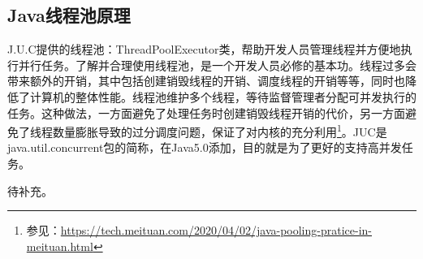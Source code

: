 \documentclass[../../../interview-questions.tex]{subfiles}
\begin{document}
\subsection{Java线程池原理}

J.U.C提供的线程池：ThreadPoolExecutor类，帮助开发人员管理线程并方便地执行并行任务。了解并合理使用线程池，是一个开发人员必修的基本功。线程过多会带来额外的开销，其中包括创建销毁线程的开销、调度线程的开销等等，同时也降低了计算机的整体性能。线程池维护多个线程，等待监督管理者分配可并发执行的任务。这种做法，一方面避免了处理任务时创建销毁线程开销的代价，另一方面避免了线程数量膨胀导致的过分调度问题，保证了对内核的充分利用\footnote{参见：\url{https://tech.meituan.com/2020/04/02/java-pooling-pratice-in-meituan.html}}。JUC是java.util.concurrent包的简称，在Java5.0添加，目的就是为了更好的支持高并发任务。

待补充。
\end{document}
